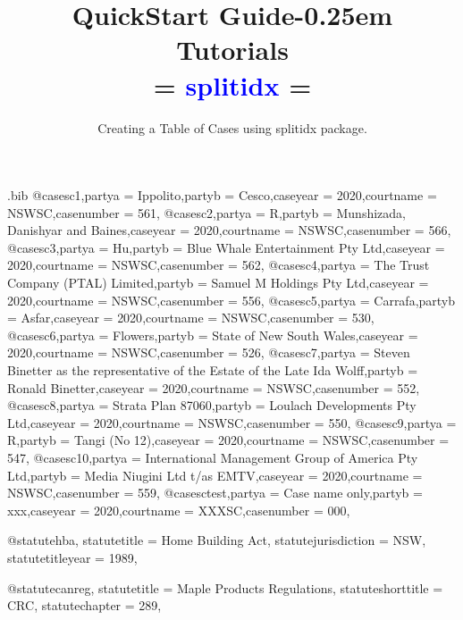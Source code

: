 

\begin{filecontents*}{\jobname.bib}
@case{sc1,partya = {Ippolito},partyb = {Cesco},caseyear = {2020},courtname = {NSWSC},casenumber = {561},}
@case{sc2,partya = {R},partyb = {Munshizada, Danishyar and Baines},caseyear = {2020},courtname = {NSWSC},casenumber = {566},}
@case{sc3,partya = {Hu},partyb = {Blue Whale Entertainment Pty Ltd},caseyear = {2020},courtname = {NSWSC},casenumber = {562},}
@case{sc4,partya = {The Trust Company (PTAL) Limited},partyb = {Samuel M Holdings Pty Ltd},caseyear = {2020},courtname = {NSWSC},casenumber = {556},}
@case{sc5,partya = {Carrafa},partyb = {Asfar},caseyear = {2020},courtname = {NSWSC},casenumber = {530},}
@case{sc6,partya = {Flowers},partyb = {State of New South Wales},caseyear = {2020},courtname = {NSWSC},casenumber = {526},}
@case{sc7,partya = {Steven Binetter as the representative of the Estate of the Late Ida Wolff},partyb = {Ronald Binetter},caseyear = {2020},courtname = {NSWSC},casenumber = {552},}
@case{sc8,partya = {Strata Plan 87060},partyb = {Loulach Developments Pty Ltd},caseyear = {2020},courtname = {NSWSC},casenumber = {550},}
@case{sc9,partya = {R},partyb = {Tangi (No 12)},caseyear = {2020},courtname = {NSWSC},casenumber = {547},}
@case{sc10,partya = {International Management Group of America Pty Ltd},partyb = {Media Niugini Ltd t/as EMTV},caseyear = {2020},courtname = {NSWSC},casenumber = {559},}
@case{sctest,partya = {Case name only},partyb = {xxx},caseyear = {2020},courtname = {XXXSC},casenumber = {000},}


@statute{hba,
statutetitle = {Home Building Act},
statutejurisdiction = {NSW},
statutetitleyear = {1989},%
}


@statute{canreg,
statutetitle = {Maple Products Regulations},
statuteshorttitle = {CRC},
statutechapter = {289},
}

\end{filecontents*}



\documentclass[12pt]{article}
\newcommand\rulesep{\rule{0.4\textwidth}{.4pt}}
\usepackage[table]{xcolor}
\pagecolor{green!3}

\newcommand\term[1]{{\sffamily\color{blue}#1}}
\title{QuickStart Guide\kern-0.25em\llap{\raisebox{1.5ex}{{\tiny\term{lawcite}}}}\\Tutorials\\ = \colorbox{yellow!40!green!20}{\textcolor{blue}{splitidx}} = }
\author{Creating a Table of Cases using \term{splitidx} package.}
\date{}
\usepackage{fontspec}
\setmainfont{Noto Serif}
\usepackage{xparse}

